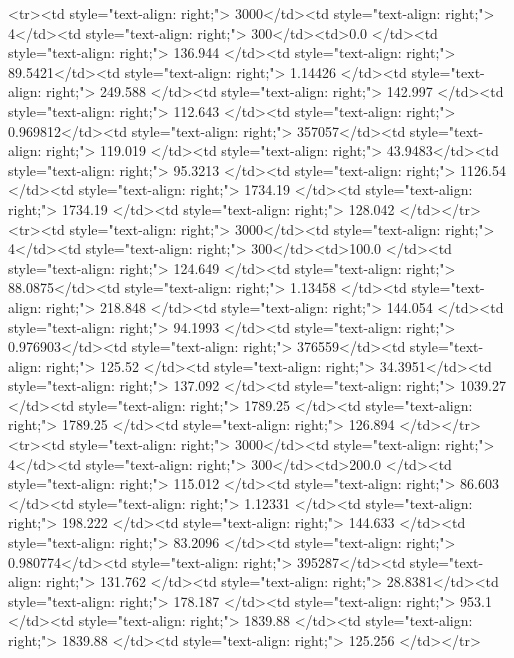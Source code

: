 <tr><td style="text-align: right;">      3000</td><td style="text-align: right;">         4</td><td style="text-align: right;">           300</td><td>0.0          </td><td style="text-align: right;">               136.944 </td><td style="text-align: right;">            89.5421</td><td style="text-align: right;">         1.14426 </td><td style="text-align: right;">        249.588 </td><td style="text-align: right;">           142.997 </td><td style="text-align: right;">             112.643   </td><td style="text-align: right;">             0.969812</td><td style="text-align: right;">              357057</td><td style="text-align: right;">                      119.019 </td><td style="text-align: right;">            43.9483</td><td style="text-align: right;">                95.3213 </td><td style="text-align: right;">      1126.54  </td><td style="text-align: right;">   1734.19 </td><td style="text-align: right;">      1734.19 </td><td style="text-align: right;">                128.042 </td></tr>
<tr><td style="text-align: right;">      3000</td><td style="text-align: right;">         4</td><td style="text-align: right;">           300</td><td>100.0        </td><td style="text-align: right;">               124.649 </td><td style="text-align: right;">            88.0875</td><td style="text-align: right;">         1.13458 </td><td style="text-align: right;">        218.848 </td><td style="text-align: right;">           144.054 </td><td style="text-align: right;">              94.1993  </td><td style="text-align: right;">             0.976903</td><td style="text-align: right;">              376559</td><td style="text-align: right;">                      125.52  </td><td style="text-align: right;">            34.3951</td><td style="text-align: right;">               137.092  </td><td style="text-align: right;">      1039.27  </td><td style="text-align: right;">   1789.25 </td><td style="text-align: right;">      1789.25 </td><td style="text-align: right;">                126.894 </td></tr>
<tr><td style="text-align: right;">      3000</td><td style="text-align: right;">         4</td><td style="text-align: right;">           300</td><td>200.0        </td><td style="text-align: right;">               115.012 </td><td style="text-align: right;">            86.603 </td><td style="text-align: right;">         1.12331 </td><td style="text-align: right;">        198.222 </td><td style="text-align: right;">           144.633 </td><td style="text-align: right;">              83.2096  </td><td style="text-align: right;">             0.980774</td><td style="text-align: right;">              395287</td><td style="text-align: right;">                      131.762 </td><td style="text-align: right;">            28.8381</td><td style="text-align: right;">               178.187  </td><td style="text-align: right;">       953.1   </td><td style="text-align: right;">   1839.88 </td><td style="text-align: right;">      1839.88 </td><td style="text-align: right;">                125.256 </td></tr>

